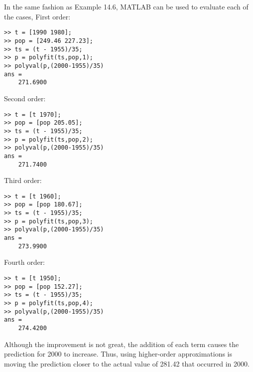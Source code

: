 \documentclass[../main.tex]{subfiles}
\begin{document}
\section{}
In the same fashion as Example 14.6, MATLAB can be used to evaluate each of the cases,
	\bigbreak
First order:
	\bigbreak
\begin{lstlisting}[numbers=none]
>> t = [1990 1980];
>> pop = [249.46 227.23];
>> ts = (t - 1955)/35;
>> p = polyfit(ts,pop,1);
>> polyval(p,(2000-1955)/35)
ans =
	271.6900
\end{lstlisting}
	\bigbreak
Second order:
	\bigbreak
\begin{lstlisting}[numbers=none]
>> t = [t 1970];
>> pop = [pop 205.05];
>> ts = (t - 1955)/35;
>> p = polyfit(ts,pop,2);
>> polyval(p,(2000-1955)/35)
ans =
	271.7400 
\end{lstlisting}
	\bigbreak
Third order:
	\bigbreak
\begin{lstlisting}[numbers=none]
>> t = [t 1960];
>> pop = [pop 180.67];
>> ts = (t - 1955)/35;
>> p = polyfit(ts,pop,3);
>> polyval(p,(2000-1955)/35)
ans =
	273.9900
\end{lstlisting}
	\bigbreak
Fourth order:
	\bigbreak
\begin{lstlisting}[numbers=none]
>> t = [t 1950];
>> pop = [pop 152.27];
>> ts = (t - 1955)/35;
>> p = polyfit(ts,pop,4);
>> polyval(p,(2000-1955)/35)
ans =
	274.4200
\end{lstlisting}
	\bigbreak
\begin{blockquote}
Although the improvement is not great, the addition of each term causes the prediction for
2000 to increase. Thus, using higher-order approximations is moving the prediction closer
to the actual value of 281.42 that occurred in 2000.
\end{blockquote}
\end{document}
